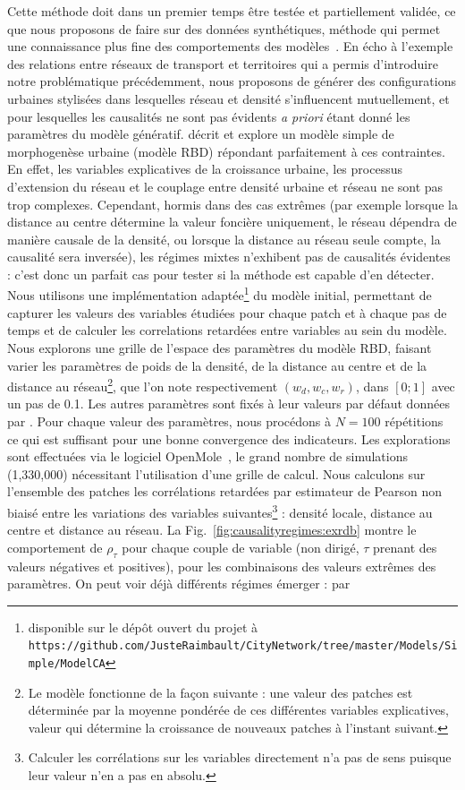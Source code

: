 {}{
Cette méthode doit dans un premier temps être testée et partiellement validée, ce que nous proposons de faire sur des données synthétiques, méthode qui permet une connaissance plus fine des comportements des modèles~\cite{raimbault2016generation}. En écho à l'exemple des relations entre réseaux de transport et territoires qui a permis d'introduire notre problématique précédemment, nous proposons de générer des configurations urbaines stylisées dans lesquelles réseau et densité s'influencent mutuellement, et pour lesquelles les causalités ne sont pas évidents \emph{a priori} étant donné les paramètres du modèle génératif. \cite{raimbault2014hybrid} décrit et explore un modèle simple de morphogenèse urbaine (modèle RBD) répondant parfaitement à ces contraintes. En effet, les variables explicatives de la croissance urbaine, les processus d'extension du réseau et le couplage entre densité urbaine et réseau ne sont pas trop complexes. Cependant, hormis dans des cas extrêmes (par exemple lorsque la distance au centre détermine la valeur foncière uniquement, le réseau dépendra de manière causale de la densité, ou lorsque la distance au réseau seule compte, la causalité sera inversée), les régimes mixtes n'exhibent pas de causalités évidentes : c'est donc un parfait cas pour tester si la méthode est capable d'en détecter. Nous utilisons une implémentation adaptée\footnote{disponible sur le dépôt ouvert du projet à\\\texttt{https://github.com/JusteRaimbault/CityNetwork/tree/master/Models/Simple/ModelCA}} du modèle initial, permettant de capturer les valeurs des variables étudiées pour chaque patch et à chaque pas de temps et de calculer les correlations retardées entre variables au sein du modèle. Nous explorons une grille de l'espace des paramètres du modèle RBD, faisant varier les paramètres de poids de la densité, de la distance au centre et de la distance au réseau\footnote{Le modèle fonctionne de la façon suivante : une valeur des patches est déterminée par la moyenne pondérée de ces différentes variables explicatives, valeur qui détermine la croissance de nouveaux patches à l'instant suivant.}, que l'on note respectivement $(w_{d},w_{c},w_{r})$, dans $\left[0;1\right]$ avec un pas de 0.1. Les autres paramètres sont fixés à leur valeurs par défaut données par \cite{raimbault2014hybrid}. Pour chaque valeur des paramètres, nous procédons à $N=100$ répétitions ce qui est suffisant pour une bonne convergence des indicateurs. Les explorations sont effectuées via le logiciel OpenMole~\cite{reuillon2013openmole}, le grand nombre de simulations (1,330,000) nécessitant l'utilisation d'une grille de calcul. Nous calculons sur l'ensemble des patches les corrélations retardées par estimateur de Pearson non biaisé entre les variations des variables suivantes\footnote{Calculer les corrélations sur les variables directement n'a pas de sens puisque leur valeur n'en a pas en absolu.} : densité locale, distance au centre et distance au réseau. La Fig.~\ref{fig:causalityregimes:exrdb} montre le comportement de $\rho_{\tau}$ pour chaque couple de variable (non dirigé, $\tau$ prenant des valeurs négatives et positives), pour les combinaisons des valeurs extrêmes des paramètres. On peut voir déjà différents régimes émerger : par }
